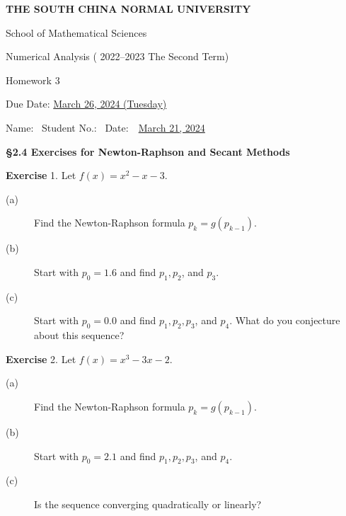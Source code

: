 \documentclass[12pt,twoside]{article}
\makeatletter
\newenvironment{exercise}[1][{\color{blue}\bf Exercise}]%
{%
 \begin{center}   \begin{lrbox}{\@tempboxa}%
    \begin{minipage}{\textwidth}%
  {\color{blue}\bfseries
#1}   }{%
    \end{minipage}%
    \end{lrbox}
    \colorbox{green}{\noindent\usebox{\@tempboxa}} \end{center}  
}
\makeatother
\begin{document}

\begin{center}
{\bf  THE SOUTH CHINA NORMAL UNIVERSITY\vspace{0.08cm}

School of Mathematical Sciences\vspace{0.08cm}
 
Numerical Analysis ( 2022--2023 The Second Term) \vspace{0.18cm}

{\Large Homework 3}\vspace{0.18cm}

Due Date: \underline{March 26, 2024 (Tuesday)} }
\end{center}\vspace{0.06cm}

\begin{center}
Name:\ \underline{\hspace{4cm}}\hspace{0.298cm}  
% 
Student No.:\ \underline{\hspace{4cm}} 
%
Date:\ \ \underline{March 21, 2024} 
 \end{center}

 

\begin{center}  \bf \Large
{\S 2.4 Exercises for Newton-Raphson and Secant Methods}
\end{center} 
  
\begin{exercise}1. \quad 
 Let $f(x) = x^2-x-3$. 
\begin{description}
\item[(a)] Find the Newton-Raphson formula $p_k = g (p_{k-1})$. 
\item[(b)] Start with $p_0 = 1.6$ and find $p_1, p_2$, and $p_3$. 
\item[(c)] Start with $p_0 = 0.0$ and find $p_1, p_2, p_3$, and $p_4$. What do you conjecture about this sequence?
\end{description}
 \end{exercise}
  
 
 
 
\begin{exercise}2. \quad
 Let $f(x) = x^3-3x-2$. 
\begin{description}
\item[(a)] Find the Newton-Raphson formula $p_k = g (p_{k-1})$. 
\item[(b)] Start with $p_0 = 2.1$ and find $p_1, p_2, p_3$, and $p_4$. 
\item[(c)] Is the sequence converging quadratically or linearly?
\end{description}
\end{exercise}
 
 
\end{document}
